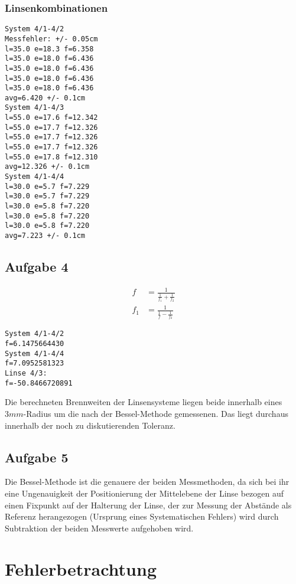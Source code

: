 \documentclass[12pt,a4paper,notitlepage]{article}
\begin{document}
\subsubsection{Linsenkombinationen}
\begin{verbatim}
System 4/1-4/2
Messfehler: +/- 0.05cm
l=35.0 e=18.3 f=6.358
l=35.0 e=18.0 f=6.436
l=35.0 e=18.0 f=6.436
l=35.0 e=18.0 f=6.436
l=35.0 e=18.0 f=6.436
avg=6.420 +/- 0.1cm
System 4/1-4/3
l=55.0 e=17.6 f=12.342
l=55.0 e=17.7 f=12.326
l=55.0 e=17.7 f=12.326
l=55.0 e=17.7 f=12.326
l=55.0 e=17.8 f=12.310
avg=12.326 +/- 0.1cm
System 4/1-4/4
l=30.0 e=5.7 f=7.229
l=30.0 e=5.7 f=7.229
l=30.0 e=5.8 f=7.220
l=30.0 e=5.8 f=7.220
l=30.0 e=5.8 f=7.220
avg=7.223 +/- 0.1cm
\end{verbatim}
\subsection{Aufgabe 4}
\begin{align}
f&=\frac{1}{\frac{1}{f_1}+\frac{1}{f_2}}\\
f_1&=\frac{1}{\frac{1}{f}-\frac{1}{f_2}}
\end{align}
\begin{verbatim}
System 4/1-4/2
f=6.1475664430
System 4/1-4/4
f=7.0952581323
Linse 4/3:
f=-50.8466720891
\end{verbatim}
Die berechneten Brennweiten der Linsensysteme liegen beide innerhalb eines $3mm$-Radius um die nach der Bessel-Methode gemessenen. Das liegt durchaus innerhalb der noch zu diskutierenden Toleranz.
\subsection{Aufgabe 5}
Die Bessel-Methode ist die genauere der beiden Messmethoden, da sich bei ihr eine Ungenauigkeit  der Positionierung der Mittelebene der Linse bezogen auf einen Fixpunkt auf der Halterung der Linse, der zur Messung der Abstände als Referenz herangezogen (Ursprung eines Systematischen Fehlers) wird durch Subtraktion der beiden Messwerte aufgehoben wird.
\section{Fehlerbetrachtung}
\end{document}
